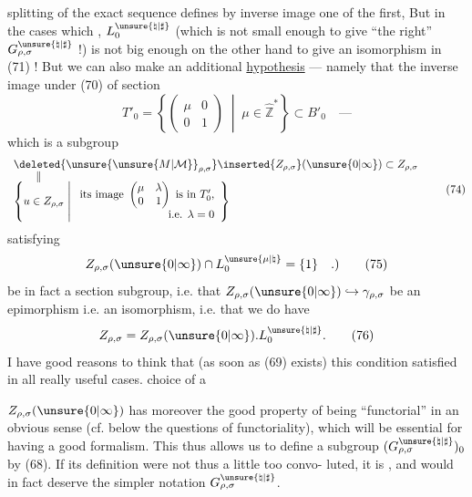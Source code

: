 splitting of the  exact sequence defines by
inverse image one of the first, 
But in the  cases which ,
$L_0^{\unsure{\natural|\sharp}}$ (which is not small enough to give
``the right''  $G_{\rho,\sigma}^{\unsure{\natural|\sharp}}$ !)
is not big enough on the other hand to give an isomorphism in (71) !
But  we can also make an
additional \uline{hypothesis} --- namely that the inverse image under (70)
of  section
\[
T'_0=\left\{
\begin{pmatrix}\mu&0\\0&1\end{pmatrix}
\;\middle|\;\mu\in\widehat{\mathbb Z}^*
\right\}\subset B'_0
\quad\text{---}
\tag{73}
\]
which is a subgroup
\[
\begin{array}{l}
\deleted{\unsure{\unsure{M|\mathcal{M}}}_{\rho,\sigma}}\inserted{Z_{\rho,\sigma}}
(\unsure{0|\infty})\subset Z_{\rho,\sigma}\\[-2pt]
\qquad\Vert\\[-2pt]
\left\{
u\in Z_{\rho,\sigma}\;\middle|\;
\begin{array}{l}
\text{its image }
\begin{pmatrix}\mu&\lambda\\0&1\end{pmatrix}
\text{ is in }T'_0,\\
\hfill\text{i.e. }\lambda=0
\end{array}
\right\}
\end{array}
\tag{74}
\]
satisfying
\[
Z_{\rho,\sigma}(\unsure{0|\infty})\cap L_0^{\unsure{\mu|\natural}}
=\{1\}\quad.)
\tag{75}
\]
be in fact a section subgroup,
i.e. that $Z_{\rho,\sigma}(\unsure{0|\infty})\hookrightarrow\gamma_{\rho,\sigma}$
be an epimorphism i.e. an isomorphism, i.e. that we do have
\[
Z_{\rho,\sigma}
=Z_{\rho,\sigma}(\unsure{0|\infty}).L_0^{\unsure{\natural|\sharp}}.
\tag{76}
\]
I have good reasons to think that (as soon as (69) exists)
this condition  satisfied in all really useful cases.
 choice of a



$Z_{\rho,\sigma}(\unsure{0|\infty})$ has moreover the good property of being
``functorial'' in an obvious sense (cf. below the questions of functoriality),
which will be essential for having a good formalism. This thus allows us
to define a subgroup
$(G_{\rho,\sigma}^{\unsure{\natural|\sharp}})_0$
by (68). If its definition were not thus a little too convo-\linebreak
luted, it is
,
and would in fact deserve the simpler notation
$G_{\rho,\sigma}^{\unsure{\natural|\sharp}}$.

